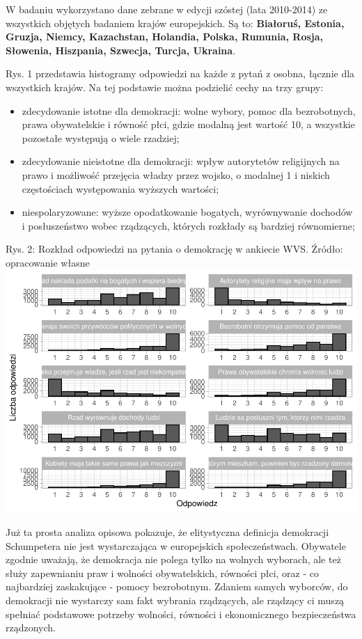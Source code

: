 \documentclass[12pt]{article}
\providecommand{\tightlist}{%
  \setlength{\itemsep}{0pt}\setlength{\parskip}{0pt}}
\begin{document}
W badaniu wykorzystano dane zebrane w edycji szóstej (lata 2010-2014) ze wszystkich objętych badaniem krajów europejskich. Są to: \textbf{Białoruś, Estonia, Gruzja, Niemcy, Kazachstan, Holandia, Polska, Rumunia, Rosja, Słowenia, Hiszpania, Szwecja, Turcja, Ukraina}.

Rys. 1 przedstawia histogramy odpowiedzi na każde z pytań z osobna, łącznie dla wszystkich krajów. Na tej podstawie można podzielić cechy na trzy grupy:

\begin{itemize}
\tightlist
\item
  zdecydowanie istotne dla demokracji: wolne wybory, pomoc dla bezrobotnych, prawa obywatelskie i równość płci, gdzie modalną jest wartość 10, a wszystkie pozostałe występują o wiele rzadziej;
\item
  zdecydowanie nieistotne dla demokracji: wpływ autorytetów religijnych na prawo i możliwość przejęcia władzy przez wojsko, o modalnej 1 i niskich częstościach występowania wyższych wartości;
\item
  niespolaryzowane: wyższe opodatkowanie bogatych, wyrównywanie dochodów i posłuszeństwo wobec rządzących, których rozkłady są bardziej równomierne;
\end{itemize}

Rys. 2: Rozkład odpowiedzi na pytania o demokrację w ankiecie WVS. Źródło: opracowanie własne
\includegraphics{text_ASA_files/figure-latex/descr-plot-1.pdf}

Już ta prosta analiza opisowa pokazuje, że elitystyczna definicja demokracji Schumpetera nie jest wystarczająca w europejskich społeczeństwach. Obywatele zgodnie uważają, że demokracja nie polega tylko na wolnych wyborach, ale też służy zapewnianiu praw i wolności obywatelskich, równości płci, oraz - co najbardziej zaskakujące - pomocy bezrobotnym. Zdaniem samych wyborców, do demokracji nie wystarczy sam fakt wybrania rządzących, ale rządzący ci muszą spełniać podstawowe potrzeby wolności, równości i ekonomicznego bezpieczeństwa rządzonych.
\end{document}
